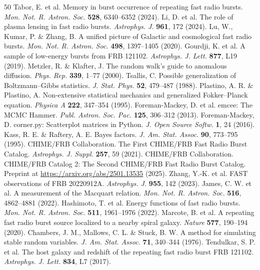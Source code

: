 \documentclass[twocolumn]{article}
\begin{document}
\begin{thebibliography}{50}
 Tabor, E. et al. Memory in burst occurrence of repeating fast radio bursts. \textit{Mon. Not. R. Astron. Soc.} \textbf{528}, 6340--6352 (2024).
 Li, D. et al. The role of plasma lensing in fast radio bursts. \textit{Astrophys. J.} \textbf{961}, 172 (2024).
 Lu, W., Kumar, P. \& Zhang, B. A unified picture of Galactic and cosmological fast radio bursts. \textit{Mon. Not. R. Astron. Soc.} \textbf{498}, 1397--1405 (2020).
 Gourdji, K. et al. A sample of low-energy bursts from FRB 121102. \textit{Astrophys. J. Lett.} \textbf{877}, L19 (2019).
 Metzler, R. \& Klafter, J. The random walk's guide to anomalous diffusion. \textit{Phys. Rep.} \textbf{339}, 1--77 (2000).
 Tsallis, C. Possible generalization of Boltzmann--Gibbs statistics. \textit{J. Stat. Phys.} \textbf{52}, 479--487 (1988).
 Plastino, A. R. \& Plastino, A. Non-extensive statistical mechanics and generalized Fokker--Planck equation. \textit{Physica A} \textbf{222}, 347--354 (1995).
 Foreman-Mackey, D. et al. emcee: The MCMC Hammer. \textit{Publ. Astron. Soc. Pac.} \textbf{125}, 306--312 (2013).
 Foreman-Mackey, D. corner.py: Scatterplot matrices in Python. \textit{J. Open Source Softw.} \textbf{1}, 24 (2016).
 Kass, R. E. \& Raftery, A. E. Bayes factors. \textit{J. Am. Stat. Assoc.} \textbf{90}, 773--795 (1995).
 CHIME/FRB Collaboration. The First CHIME/FRB Fast Radio Burst Catalog. \textit{Astrophys. J. Suppl.} \textbf{257}, 59 (2021).
 CHIME/FRB Collaboration. CHIME/FRB Catalog 2: The Second CHIME/FRB Fast Radio Burst Catalog. Preprint at \url{https://arxiv.org/abs/2501.13535} (2025).
 Zhang, Y.-K. et al. FAST observations of FRB 20220912A. \textit{Astrophys. J.} \textbf{955}, 142 (2023).
 James, C. W. et al. A measurement of the Macquart relation. \textit{Mon. Not. R. Astron. Soc.} \textbf{516}, 4862--4881 (2022).
 Hashimoto, T. et al. Energy functions of fast radio bursts. \textit{Mon. Not. R. Astron. Soc.} \textbf{511}, 1961--1976 (2022).
 Marcote, B. et al. A repeating fast radio burst source localized to a nearby spiral galaxy. \textit{Nature} \textbf{577}, 190--194 (2020).
 Chambers, J. M., Mallows, C. L. \& Stuck, B. W. A method for simulating stable random variables. \textit{J. Am. Stat. Assoc.} \textbf{71}, 340--344 (1976).
 Tendulkar, S. P. et al. The host galaxy and redshift of the repeating fast radio burst FRB 121102. \textit{Astrophys. J. Lett.} \textbf{834}, L7 (2017).
\end{thebibliography}
\end{document}
